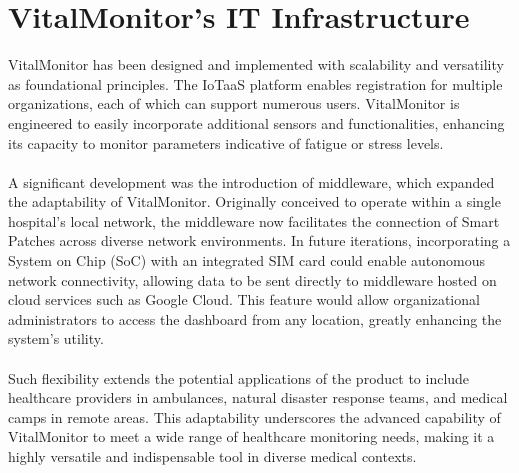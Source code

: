 \section{VitalMonitor's IT Infrastructure}

VitalMonitor has been designed and implemented with scalability and versatility as foundational principles. The IoTaaS platform enables registration for multiple organizations, each of which can support numerous users. VitalMonitor is engineered to easily incorporate additional sensors and functionalities, enhancing its capacity to monitor parameters indicative of fatigue or stress levels. \\ \\
A significant development was the introduction of middleware, which expanded the adaptability of VitalMonitor. Originally conceived to operate within a single hospital's local network, the middleware now facilitates the connection of Smart Patches across diverse network environments. In future iterations, incorporating a System on Chip (SoC) with an integrated SIM card could enable autonomous network connectivity, allowing data to be sent directly to middleware hosted on cloud services such as Google Cloud. This feature would allow organizational administrators to access the dashboard from any location, greatly enhancing the system's utility. \\ \\
Such flexibility extends the potential applications of the product to include healthcare providers in ambulances, natural disaster response teams, and medical camps in remote areas. This adaptability underscores the advanced capability of VitalMonitor to meet a wide range of healthcare monitoring needs, making it a highly versatile and indispensable tool in diverse medical contexts.




